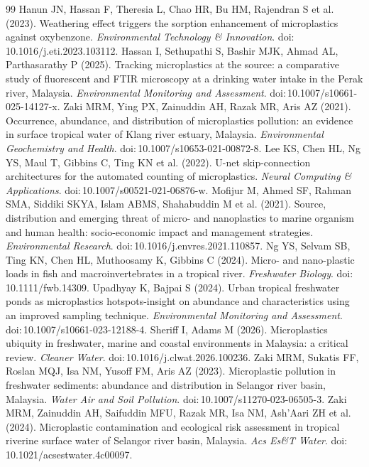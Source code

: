 \documentclass[11pt,a4paper]{article}
\begin{document}
\begin{thebibliography}{99}
 Hanun JN, Hassan F, Theresia L, Chao HR, Bu HM, Rajendran S et al. (2023). Weathering effect triggers the sorption enhancement of microplastics against oxybenzone. \textit{Environmental Technology \& Innovation}. doi:\,10.1016/j.eti.2023.103112.
 Hassan I, Sethupathi S, Bashir MJK, Ahmad AL, Parthasarathy P (2025). Tracking microplastics at the source: a comparative study of fluorescent and FTIR microscopy at a drinking water intake in the Perak river, Malaysia. \textit{Environmental Monitoring and Assessment}. doi:\,10.1007/s10661-025-14127-x.
 Zaki MRM, Ying PX, Zainuddin AH, Razak MR, Aris AZ (2021). Occurrence, abundance, and distribution of microplastics pollution: an evidence in surface tropical water of Klang river estuary, Malaysia. \textit{Environmental Geochemistry and Health}. doi:\,10.1007/s10653-021-00872-8.
 Lee KS, Chen HL, Ng YS, Maul T, Gibbins C, Ting KN et al. (2022). U-net skip-connection architectures for the automated counting of microplastics. \textit{Neural Computing \& Applications}. doi:\,10.1007/s00521-021-06876-w.
 Mofijur M, Ahmed SF, Rahman SMA, Siddiki SKYA, Islam ABMS, Shahabuddin M et al. (2021). Source, distribution and emerging threat of micro- and nanoplastics to marine organism and human health: socio-economic impact and management strategies. \textit{Environmental Research}. doi:\,10.1016/j.envres.2021.110857.
 Ng YS, Selvam SB, Ting KN, Chen HL, Muthoosamy K, Gibbins C (2024). Micro- and nano-plastic loads in fish and macroinvertebrates in a tropical river. \textit{Freshwater Biology}. doi:\,10.1111/fwb.14309.
 Upadhyay K, Bajpai S (2024). Urban tropical freshwater ponds as microplastics hotspots-insight on abundance and characteristics using an improved sampling technique. \textit{Environmental Monitoring and Assessment}. doi:\,10.1007/s10661-023-12188-4.
 Sheriff I, Adams M (2026). Microplastics ubiquity in freshwater, marine and coastal environments in Malaysia: a critical review. \textit{Cleaner Water}. doi:\,10.1016/j.clwat.2026.100236.
 Zaki MRM, Sukatis FF, Roslan MQJ, Isa NM, Yusoff FM, Aris AZ (2023). Microplastic pollution in freshwater sediments: abundance and distribution in Selangor river basin, Malaysia. \textit{Water Air and Soil Pollution}. doi:\,10.1007/s11270-023-06505-3.
 Zaki MRM, Zainuddin AH, Saifuddin MFU, Razak MR, Isa NM, Ash'Aari ZH et al. (2024). Microplastic contamination and ecological risk assessment in tropical riverine surface water of Selangor river basin, Malaysia. \textit{Acs Es\&T Water}. doi:\,10.1021/acsestwater.4c00097.
\end{thebibliography}
\end{document}
